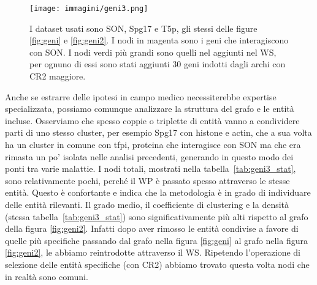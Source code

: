 \documentclass[12pt]{report}
\begin{document}
\begin{figure}[!htb]
\centering
\texttt{[image: immagini/geni3.png]}
\caption{\footnotesize{I dataset usati sono SON, Spg17 e T5p, gli stessi delle figure \ref{fig:geni} e \ref{fig:geni2}. I nodi in magenta sono i geni che interagiscono con SON. I nodi verdi più grandi sono quelli nel aggiunti nel WS, per ognuno di essi sono stati aggiunti 30 geni indotti dagli archi con CR2 maggiore.}}
\label{fig:geni3}
\end{figure}

Anche se estrarre delle ipotesi in campo medico necessiterebbe expertise specializzata, possiamo comunque analizzare la struttura del grafo e le entità incluse.  Osserviamo che spesso coppie o triplette di entità vanno a condividere parti di uno stesso cluster, per esempio Spg17 con histone e actin, che a sua volta ha un cluster in comune con tfpi, proteina che interagisce con SON ma che era rimasta un po' isolata nelle analisi precedenti, generando in questo modo dei ponti tra varie malattie.
I nodi totali, mostrati nella tabella~\ref{tab:geni3_stat}, sono relativamente pochi, perché il WP è passato spesso attraverso le stesse entità. Questo è confortante e indica che la metodologia è in grado di individuare delle entità rilevanti. Il grado medio, il coefficiente di clustering e la densità (stessa tabella~\ref{tab:geni3_stat}) sono significativamente più alti rispetto al grafo della figura \ref{fig:geni2}. Infatti dopo aver rimosso le entità condivise a favore di quelle più specifiche passando dal grafo nella figura \ref{fig:geni} al grafo nella figura \ref{fig:geni2}, le abbiamo reintrodotte attraverso il WS. Ripetendo l'operazione di selezione delle entità specifiche (con CR2) abbiamo trovato questa volta nodi che in realtà sono comuni.
\end{document}
